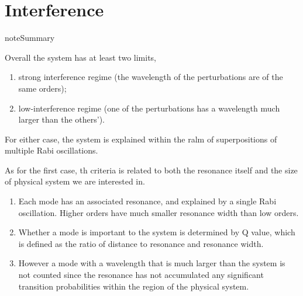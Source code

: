 \documentclass[letterpaper,12pt,english]{sphinxmanual}
\begin{document}
\section{Interference}
\label{\detokenize{matter-stimulated/interference:interference}}\label{\detokenize{matter-stimulated/interference::doc}}
\begin{sphinxadmonition}{note}{Summary}

Overall the system has at least two limits,
\begin{enumerate}
\item {} 
strong interference regime (the wavelength of the perturbations are of the same orders);

\item {} 
low-interference regime (one of the perturbations has a wavelength much larger than the others').

\end{enumerate}

For either case, the system is explained within the ralm of superpositions of multiple Rabi oscillations.

As for the first case, th criteria is related to both the resonance itself and the size of physical system we are interested in.
\begin{enumerate}
\item {} 
Each mode has an associated resonance, and explained by a single Rabi oscillation. Higher orders have much smaller resonance width than low orders.

\item {} 
Whether a mode is important to the system is determined by Q value, which is defined as the ratio of distance to resonance and resonance width.

\item {} 
However a mode with a wavelength that is much larger than the system is not counted since the resonance has not accumulated any significant transition probabilities within the region of the physical system.

\end{enumerate}



\end{sphinxadmonition}
\end{document}
